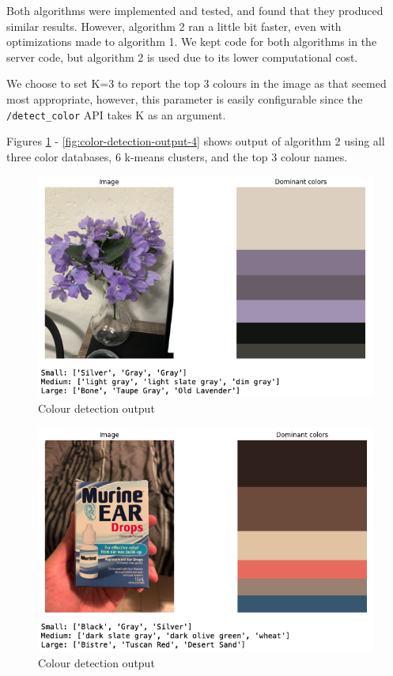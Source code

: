 \documentclass[a4paper,11pt]{article}
\begin{document}
Both algorithms were implemented and tested, and found that they produced similar results. However, algorithm 2 ran a little bit faster, even with optimizations made to algorithm 1. We kept code for both algorithms in the server code, but algorithm 2 is used due to its lower computational cost.

We choose to set K=3 to report the top 3 colours in the image as that seemed most appropriate, however, this parameter is easily configurable since the \texttt{/detect\_color} API takes K as an argument.

Figures \ref{fig:color-detection-output-1} - \ref{fig:color-detection-output-4} shows output of algorithm 2 using all three color databases, 6 k-means clusters, and the top 3 colour names.

\begin{figure}[H]
\centering
\includegraphics[scale=0.6]{img/cv/colour_detection/colour_detection_1.png}
\caption{Colour detection output}
\label{fig:color-detection-output-1}
\end{figure}

\begin{figure}[H]
\centering
\includegraphics[scale=0.6]{img/cv/colour_detection/colour_detection_2.png}
\caption{Colour detection output}
\label{fig:color-detection-output-2}
\end{figure}
\end{document}
